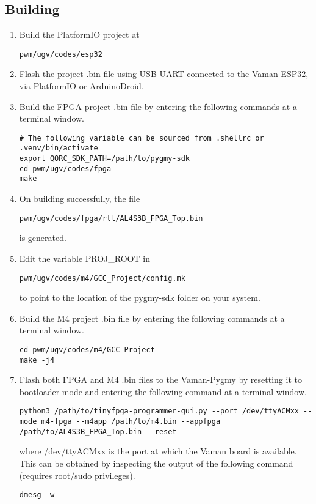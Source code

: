 \subsection{Building}
\begin{enumerate}
    \item Build the PlatformIO project at
    \begin{lstlisting}
pwm/ugv/codes/esp32
    \end{lstlisting}
    \item Flash the project .bin file using USB-UART connected to the 
    Vaman-ESP32, via PlatformIO or ArduinoDroid.
    \item Build the FPGA project .bin file by entering the following commands at
    a terminal window.
    \begin{lstlisting}
# The following variable can be sourced from .shellrc or .venv/bin/activate
export QORC_SDK_PATH=/path/to/pygmy-sdk
cd pwm/ugv/codes/fpga
make
    \end{lstlisting}
    \item On building successfully, the file
    \begin{lstlisting}
pwm/ugv/codes/fpga/rtl/AL4S3B_FPGA_Top.bin
    \end{lstlisting}
    is generated.
    \item Edit the variable PROJ\_ROOT in
    \begin{lstlisting}
pwm/ugv/codes/m4/GCC_Project/config.mk
    \end{lstlisting}
    to point to the location of the pygmy-sdk folder on your system.
    \item Build the M4 project .bin file by entering the following commands at a
    terminal window.
    \begin{lstlisting}
cd pwm/ugv/codes/m4/GCC_Project
make -j4
    \end{lstlisting}
    \item Flash both FPGA and M4 .bin files to the Vaman-Pygmy by resetting it
    to bootloader mode and entering the following command at a terminal window.
    \begin{lstlisting}
python3 /path/to/tinyfpga-programmer-gui.py --port /dev/ttyACMxx --mode m4-fpga --m4app /path/to/m4.bin --appfpga /path/to/AL4S3B_FPGA_Top.bin --reset
    \end{lstlisting}
    where /dev/ttyACMxx is the port at which the Vaman board is available. This
    can be obtained by inspecting the output of the following command (requires
    root/sudo privileges).
    \begin{lstlisting}
dmesg -w
    \end{lstlisting}
\end{enumerate}

